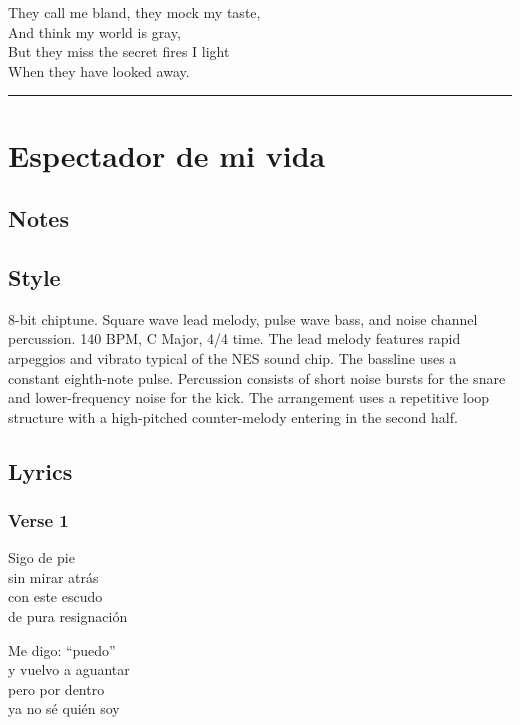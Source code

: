 They call me bland, they mock my taste,\\
And think my world is gray,\\
But they miss the secret fires I light\\
When they have looked away.

\begin{center}\rule{0.5\linewidth}{0.5pt}\end{center}

\section{Espectador de mi vida}\label{espectador-de-mi-vida}

\subsection{Notes}\label{notes-32}

\subsection{Style}\label{style-31}

8-bit chiptune. Square wave lead melody, pulse wave bass, and noise
channel percussion. 140 BPM, C Major, 4/4 time. The lead melody features
rapid arpeggios and vibrato typical of the NES sound chip. The bassline
uses a constant eighth-note pulse. Percussion consists of short noise
bursts for the snare and lower-frequency noise for the kick. The
arrangement uses a repetitive loop structure with a high-pitched
counter-melody entering in the second half.

\subsection{Lyrics}\label{lyrics-31}

\subsubsection{Verse 1}\label{verse-1-16}

Sigo de pie\\
sin mirar atrás\\
con este escudo\\
de pura resignación

Me digo: ``puedo''\\
y vuelvo a aguantar\\
pero por dentro\\
ya no sé quién soy

